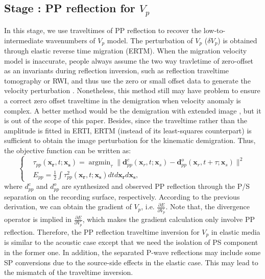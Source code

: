 \subsection{Stage \uppercase\expandafter{}: PP reflection for $V_p$}
In this stage, we use traveltimes of PP reflection to recover the low-to-intermediate wavenumbers of $V_p$ model. 
The perturbation of $V_p$ ($\delta V_p$) is obtained through elastic reverse time migration (ERTM). 
When the migration velocity model is inaccurate, 
people always assume
the two way travletime of zero-offset as an invariants during reflection inversion, such as reflection traveltime tomography or RWI,
and thus use the zero or small offset data to generate the velocity perturbation \cite[]{Zhou2015}. 
Nonetheless, this method still may have problem to ensure a correct zero offset traveltime in the
demigration when velocity anomaly is complex. A better method would be the demigration with extended
image \cite[]{Webill2013, Symes2015, Qiang2017}, but it is out of the scope of this paper.
Besides, since the traveltime rather than the amplitude is fitted in ERTI, 
ERTM (instead of its least-squares counterpart) is sufficient to obtain the image perturbation for
the kinematic demigration.
Thus, the objective function can be written as:
\begin{equation}
	\left\{
		\begin{aligned}
			&\tau_{pp}(\mathbf{x_r},t;\mathbf{x_s})=\mathop{\arg\min}_{\tau}
			\parallel\mathbf{d}^{c}_{pp}(\mathbf{x}_r,t;\mathbf{x}_s)-\mathbf{d}^{o}_{pp}(\mathbf{x}_r,t+\tau;\mathbf{x}_s)\parallel^2\\
			&E_{pp}=\frac{1}{2}\int\tau^2_{pp}(\mathbf{x_r},t;\mathbf{x_s})dtd\mathbf{x_r}d\mathbf{x_s},
		\end{aligned}
	\right.
    \label{eq:ObjectivefunctionPP} 
\end{equation}
where $d^{c}_{pp}$ and $d^{o}_{pp}$ are synthesized and observed PP reflection through the P/S
separation on the recording surface, respectively. According to the previous derivation, we can
obtain the gradient of  $V_p$, i.e. $\frac{\partial E}{\partial
V_p}$.
Note that, 
the divergence operator is implied in $\frac{\partial
E}{\partial V_p}$, which makes the gradient calculation only involve PP reflection.
Therefore, the PP reflection traveltime inversion for $V_p$ in elastic media is similar to the acoustic case
except that we need the isolation of PS component in the former one. In addition, the separated
P-wave reflections may include some SP conversions due to the source-side effects in the elastic
case. This may lead to the mismatch of the traveltime inversion.
